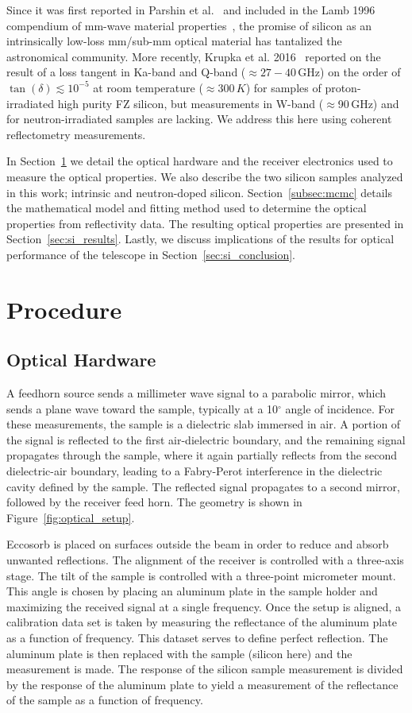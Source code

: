 Since it was first reported in Parshin et al.~\cite{parshin} and included in the Lamb 1996 compendium of mm-wave material properties~\cite{lamb}, the promise of silicon as an intrinsically low-loss mm/sub-mm optical material has tantalized the astronomical community.   More recently, Krupka et al. 2016~\cite{KRUPKA201676} reported on the result of a loss tangent in Ka-band and Q-band ($\approx27-40$\,GHz) on the order of $\tan(\delta)\lesssim 10^{-5}$ at room temperature ($\approx300\,K$) for samples of proton-irradiated high purity FZ silicon, but measurements in W-band ($\approx$90\,GHz) and for neutron-irradiated samples are lacking. We address this here using coherent reflectometry measurements.

In Section~\ref{sec:si_procedure} we detail the optical hardware and the receiver electronics used to measure the optical properties.  We also describe the two silicon samples analyzed in this work; intrinsic and neutron-doped silicon.  Section~\ref{subsec:mcmc} details the mathematical model and fitting method used to determine the optical properties from reflectivity data.  The resulting optical properties are presented in Section~\ref{sec:si_results}.  Lastly, we discuss implications of the results for optical performance of the telescope in Section~\ref{sec:si_conclusion}.
\section{Procedure}
\label{sec:si_procedure}
\subsection{Optical Hardware}
A feedhorn source sends a millimeter wave signal to a parabolic mirror, which sends a plane wave toward the sample, typically at a 10$^{\circ}$ angle of incidence. For these measurements, the sample is a dielectric slab immersed in air. A portion of the signal is reflected to the first air-dielectric boundary, and the remaining signal propagates through the sample, where it again partially reflects from the second dielectric-air boundary, leading to a Fabry-Perot interference in the dielectric cavity defined by the sample. The reflected signal propagates to a second mirror, followed by the receiver feed horn. The geometry is shown in Figure~\ref{fig:optical_setup}.

Eccosorb is placed on surfaces outside the beam in order to reduce and absorb unwanted reflections.   The alignment of the receiver is controlled with a three-axis stage. The tilt of the sample is controlled with a three-point micrometer mount.   This angle is chosen by placing an aluminum plate in the sample holder and maximizing the received signal at a single frequency. Once the setup is aligned, a calibration data set is taken by measuring the reflectance of the aluminum plate as a function of frequency. This dataset serves to define perfect reflection.   The aluminum plate is then replaced with the sample (silicon here) and the measurement is made. The response of the silicon sample measurement is divided by the response of the aluminum plate to yield a measurement of the reflectance of the sample as a function of frequency.

